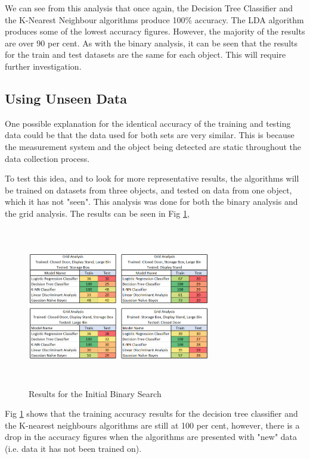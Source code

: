 \documentclass[conference]{IEEEtran}
\begin{document}
We can see from this analysis that once again, the Decision Tree Classifier and the K-Nearest Neighbour algorithms produce 100\% accuracy.  The LDA algorithm produces some of the lowest accuracy figures. However, the majority of the results are over 90 per cent. As with the binary analysis, it can be seen that the results for the train and test datasets are the same for each object. This will require further investigation.

\subsection{Using Unseen Data}
One possible explanation for the identical accuracy of the training and testing data could be that the data used for both sets are very similar. This is because the measurement system and the object being detected are static throughout the data collection process. 

To test this idea, and to look for more representative results, the algorithms will be trained on datasets from three objects, and tested on data from one object, which it has not "seen". This analysis was done for both the binary analysis and the grid analysis. The results can be seen in Fig \ref{fig:new_data_results},

\begin{figure}[ht]
\includegraphics[width=8cm, height=7cm]{images/new_data_results.png}
\centering
\caption{Results for the Initial Binary Search}
\label{fig:new_data_results}
\end{figure}

Fig \ref{fig:new_data_results} shows that the training accuracy results for the decision tree classifier and the K-nearest neighbours algorithms are still at 100 per cent, however, there is a drop in the accuracy figures when the algorithms are presented with "new" data (i.e. data it has not been trained on).
\end{document}
